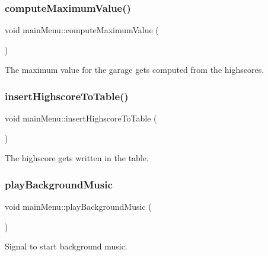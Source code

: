 \subsubsection{\texorpdfstring{computeMaximumValue()}{computeMaximumValue()}}
{\footnotesize\ttfamily void main\+Menu\+::compute\+Maximum\+Value (\begin{DoxyParamCaption}{ }\end{DoxyParamCaption})}



The maximum value for the garage gets computed from the highscores. 

\mbox{\label{classmain_menu_a3bf39f2aa22306f4d50d1721ba49d4c7}} 
\subsubsection{\texorpdfstring{insertHighscoreToTable()}{insertHighscoreToTable()}}
{\footnotesize\ttfamily void main\+Menu\+::insert\+Highscore\+To\+Table (\begin{DoxyParamCaption}{ }\end{DoxyParamCaption})}



The highscore gets written in the table. 

\mbox{\label{classmain_menu_afd6149b5864c75c9b64b56b59aeff63d}} 
\subsubsection{\texorpdfstring{playBackgroundMusic}{playBackgroundMusic}}
{\footnotesize\ttfamily void main\+Menu\+::play\+Background\+Music (\begin{DoxyParamCaption}{ }\end{DoxyParamCaption})\hspace{0.3cm}{\ttfamily [signal]}}



Signal to start background music. 

\mbox{\label{classmain_menu_a611ea90dd139e55b4c73df84ea16b5ee}} 
